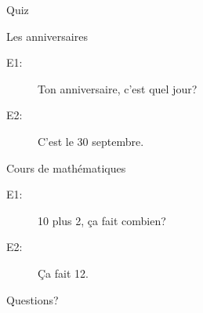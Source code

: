 \documentclass{beamer}
\begin{document}
  \begin{frame}{}
    \begin{center}
      \Large Quiz
    \end{center}
  \end{frame}

  \begin{frame}{Les anniversaires}
    \begin{description}
      \item[E1:] Ton anniversaire, c'est quel jour?
      \item[E2:] C'est le 30 septembre.
    \end{description}
  \end{frame}

  \begin{frame}{Cours de mathématiques}
    \begin{description}
      \item[E1:] 10 plus 2, ça fait combien?
      \item[E2:] Ça fait 12.
    \end{description}
  \end{frame}

  \begin{frame}{}
    \begin{center}
      \Large Questions?
    \end{center}
  \end{frame}
\end{document}
